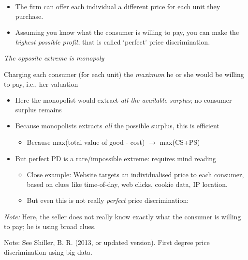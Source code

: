 \documentclass[]{article}
\providecommand{\tightlist}{%
  \setlength{\itemsep}{0pt}\setlength{\parskip}{0pt}}
\begin{document}
\begin{itemize}
\item
  The firm can offer each individual a different price for each unit they purchase.
\item
  Assuming you know what the consumer is willing to pay, you can make the \emph{highest possible profit}; that is called `perfect' price discrimination.
\end{itemize}

\bigskip

\emph{The opposite extreme is monopoly}

\begin{description}
\tightlist
\item[Perfect price discrimination]
Charging each consumer (for each unit) the \emph{maximum} he or she would be willing to pay, i.e., her valuation
\end{description}

\bigskip

\begin{itemize}
\tightlist
\item
  Here the monopolist would extract \emph{all the available surplus}; no consumer surplus remains
\item
  Because monopolists extracts \emph{all} the possible surplus, this is efficient

  \begin{itemize}
  \tightlist
  \item
    Because max(total value of good - cost) \(\rightarrow\) max(CS+PS)
  \end{itemize}
\item
  But perfect PD is a rare/impossible extreme: requires mind reading

  \begin{itemize}
  \tightlist
  \item
    Close example: Website targets an individualised price to each consumer, based on clues like time-of-day, web clicks, cookie data, IP location.
  \item
    But even this is not really \emph{perfect} price discrimination:
  \end{itemize}
\end{itemize}

\emph{Note:}
Here, the seller does not really know exactly what the consumer is willing to pay; he is using broad clues.

Note: See Shiller, B. R. (2013, or updated version). First degree price discrimination using big data.
\end{document}
